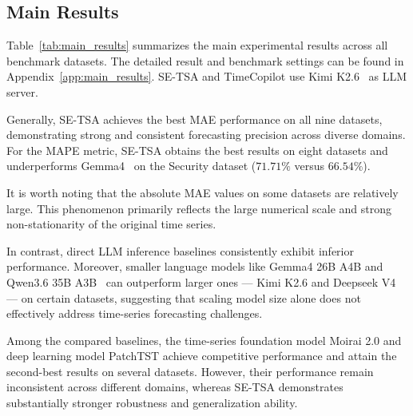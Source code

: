 \subsection{Main Results}

Table~\ref{tab:main_results} summarizes the main experimental results across all benchmark datasets. The detailed result and benchmark settings can be found in Appendix~\ref{app:main_results}. SE-TSA and TimeCopilot use Kimi K2.6~\cite{Kimi} as LLM server.

Generally, SE-TSA achieves the best MAE performance on all nine datasets, demonstrating strong and consistent forecasting precision across diverse domains. For the MAPE metric, SE-TSA obtains the best results on eight datasets and underperforms Gemma4~\cite{Gemma} on the Security dataset ($71.71\%$ versus $66.54\%$).

It is worth noting that the absolute MAE values on some datasets are relatively large. This phenomenon primarily reflects the large numerical scale and strong non-stationarity of the original time series.

In contrast, direct LLM inference baselines consistently exhibit inferior performance. Moreover, smaller language models like Gemma4 26B A4B and Qwen3.6 35B A3B~\cite{Qwen} can outperform larger ones --- Kimi K2.6 and Deepseek V4~\cite{Deepseek} --- on certain datasets, suggesting that scaling model size alone does not effectively address time-series forecasting challenges.

Among the compared baselines, the time-series foundation model Moirai 2.0  and deep learning model PatchTST achieve competitive performance and attain the second-best results on several datasets. However, their performance remain inconsistent across different domains, whereas SE-TSA demonstrates substantially stronger robustness and generalization ability.

